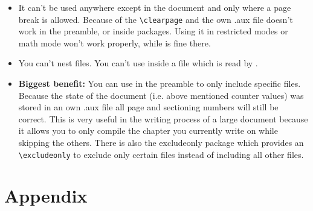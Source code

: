 \documentclass{article}
\begin{document}
\begin{itemize}
	\item It can't be used anywhere except in the document and only where a page break is allowed.
	Because of the \verb|\clearpage| and the own .aux file \verb|| doesn't work in the preamble, or inside packages. Using it in restricted modes or math mode won't work properly, while \verb|| is fine there.
	\item You can't nest \verb|| files.
	You can't use \verb|| inside a file which is read by \verb||.
	\item \textbf{Biggest benefit:} You can use \verb|| in the preamble to only include specific \verb|| files.
	Because the state of the document (i.e. above mentioned counter values) was stored in an own .aux file all page and sectioning numbers will still be correct. This is very useful in the writing process of a large document because it allows you to only compile the chapter you currently write on while skipping the others.
	There is also the excludeonly package which provides an \verb|\excludeonly| to exclude only certain files instead of including all other files.
\end{itemize}

\appendix %
\section{Appendix}
\end{document}
